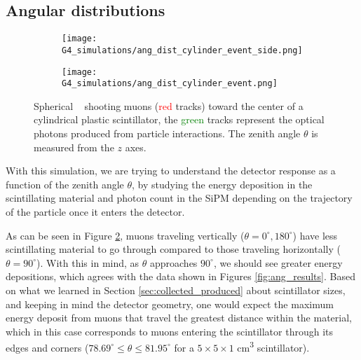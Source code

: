 
\subsection{Angular distributions}\label{sec:cos_squared}

\begin{figure}[H]
  \centering
  \begin{subfigure}[t]{0.4\textwidth}
    \texttt{[image: G4\_simulations/ang\_dist\_cylinder\_event\_side.png]}
    \caption{\label{sfig:ang_dist_cyl}}
  \end{subfigure}
  \hfill
  \begin{subfigure}[t]{0.4\textwidth}
    \texttt{[image: G4\_simulations/ang\_dist\_cylinder\_event.png]}
    \caption{\label{sfig:ang_dist_cyl_side}}
  \end{subfigure}
  \caption{\label{fig:ang_dist_cyl_event}Spherical \gps~ shooting muons (\textcolor{red}{red} tracks) toward the center of a cylindrical plastic scintillator, the \textcolor{green}{green} tracks represent the optical photons produced from particle interactions. The zenith angle $\theta$ is measured from the $z$ axes.}
\end{figure}

With this simulation, we are trying to understand the detector response as a function of the zenith angle $\theta$, by studying the energy deposition in the scintillating material and photon count in the SiPM depending on the trajectory of the particle once it enters the detector.

As can be seen in Figure \ref{sfig:ang_dist_cyl_side}, muons traveling vertically ($\theta=0^\circ, 180^\circ$) have less scintillating material to go through compared to those traveling horizontally ($\theta=90^\circ$). With this in mind, as $\theta$ approaches $90^\circ$, we should see greater energy depositions, which agrees with the data shown in Figures \ref{fig:ang_results}. Based on what we learned in Section \ref{sec:collected_produced} about scintillator sizes, and keeping in mind the detector geometry, one would expect the maximum energy deposit from muons that travel the greatest distance within the material, which in this case corresponds to muons entering the scintillator through its edges and corners ($78.69^\circ\leq\theta\leq 81.95^\circ$ for a $5\times5\times1$ \unit{\cm\cubed} scintillator).

